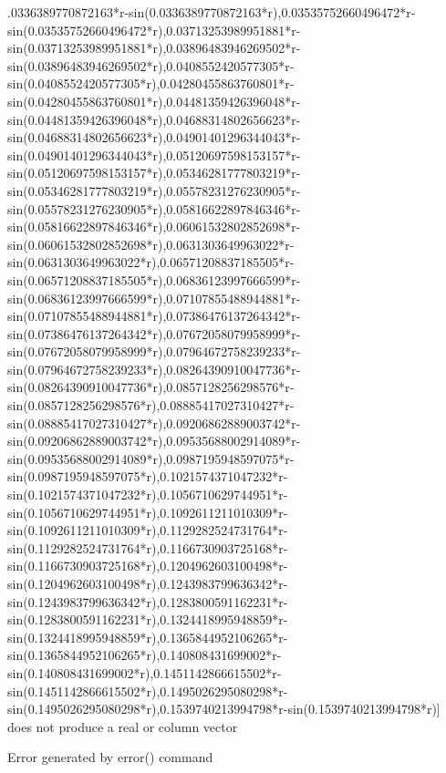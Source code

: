 \documentclass[a4paper,10pt]{article}
\begin{document}
\begin{eulernotebook}
\begin{eulercomment}
\begin{eulercomment}
\begin{eulercomment}
\begin{eulercomment}
\begin{eulercomment}
\begin{eulercomment}
\begin{eulercomment}
\begin{eulercomment}
\begin{eulercomment}
\begin{eulercomment}
\begin{eulercomment}
\begin{eulercomment}
\begin{eulercomment}
\begin{eulercomment}
\begin{eulercomment}
\begin{eulercomment}
\begin{eulercomment}
\begin{eulercomment}
\begin{euleroutput}
.0336389770872163*r-sin(0.0336389770872163*r),0.03535752660496472*r-sin(0.03535752660496472*r),0.03713253989951881*r-sin(0.03713253989951881*r),0.03896483946269502*r-sin(0.03896483946269502*r),0.0408552420577305*r-sin(0.0408552420577305*r),0.04280455863760801*r-sin(0.04280455863760801*r),0.04481359426396048*r-sin(0.04481359426396048*r),0.04688314802656623*r-sin(0.04688314802656623*r),0.04901401296344043*r-sin(0.04901401296344043*r),0.05120697598153157*r-sin(0.05120697598153157*r),0.05346281777803219*r-sin(0.05346281777803219*r),0.05578231276230905*r-sin(0.05578231276230905*r),0.05816622897846346*r-sin(0.05816622897846346*r),0.06061532802852698*r-sin(0.06061532802852698*r),0.0631303649963022*r-sin(0.0631303649963022*r),0.06571208837185505*r-sin(0.06571208837185505*r),0.06836123997666599*r-sin(0.06836123997666599*r),0.07107855488944881*r-sin(0.07107855488944881*r),0.07386476137264342*r-sin(0.07386476137264342*r),0.07672058079958999*r-sin(0.07672058079958999*r),0.07964672758239233*r-sin(0.07964672758239233*r),0.08264390910047736*r-sin(0.08264390910047736*r),0.0857128256298576*r-sin(0.0857128256298576*r),0.08885417027310427*r-sin(0.08885417027310427*r),0.09206862889003742*r-sin(0.09206862889003742*r),0.09535688002914089*r-sin(0.09535688002914089*r),0.0987195948597075*r-sin(0.0987195948597075*r),0.1021574371047232*r-sin(0.1021574371047232*r),0.1056710629744951*r-sin(0.1056710629744951*r),0.1092611211010309*r-sin(0.1092611211010309*r),0.1129282524731764*r-sin(0.1129282524731764*r),0.1166730903725168*r-sin(0.1166730903725168*r),0.1204962603100498*r-sin(0.1204962603100498*r),0.1243983799636342*r-sin(0.1243983799636342*r),0.1283800591162231*r-sin(0.1283800591162231*r),0.1324418995948859*r-sin(0.1324418995948859*r),0.1365844952106265*r-sin(0.1365844952106265*r),0.140808431699002*r-sin(0.140808431699002*r),0.1451142866615502*r-sin(0.1451142866615502*r),0.1495026295080298*r-sin(0.1495026295080298*r),0.1539740213994798*r-sin(0.1539740213994798*r)] does not produce a real or column vector
  
  Error generated by error() command
  

\end{euleroutput}
\end{eulercomment}
\end{eulercomment}
\end{eulercomment}
\end{eulercomment}
\end{eulercomment}
\end{eulercomment}
\end{eulercomment}
\end{eulercomment}
\end{eulercomment}
\end{eulercomment}
\end{eulercomment}
\end{eulercomment}
\end{eulercomment}
\end{eulercomment}
\end{eulercomment}
\end{eulercomment}
\end{eulercomment}
\end{eulercomment}
\end{eulernotebook}
\end{document}
